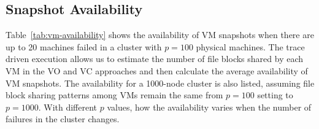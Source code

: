 \subsection{Snapshot Availability}

 Table~\ref{tab:vm-availability} shows the availability of VM snapshots when 
there are up to 20 machines failed in a cluster with $p=100$ physical machines.
The trace driven execution allows us to estimate the number of file blocks shared by each VM in the VO and VC approaches
and then calculate the average availability of VM snapshots.
The availability for  a 1000-node cluster is also listed, assuming file block sharing patterns among VMs remain
the same from $p=100$ setting to $p=1000$. With different $p$ values, how the availability varies when 
the number of failures in the cluster changes.



